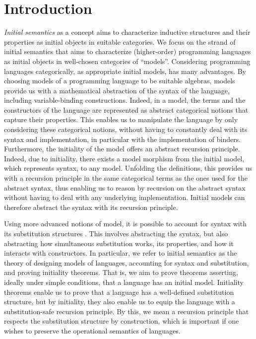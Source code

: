 \section{Introduction}

%
\emph{Initial semantics} as a concept aims to characterize inductive structures and their
properties as initial objects in suitable categories.
%
We focus on the strand of initial semantics that aims to characterize (higher-order)
programming languages as initial objects in well-chosen categories of ``models''.
%
Considering programming languages categorically, as appropriate initial models, has many advantages.
%
By choosing models of a programming language to be suitable algebras, models
provide us with a mathematical abstraction of the syntax of the language, including
variable-binding constructions.
%
Indeed, in a model, the terms and the constructors of the language are
represented as abstract categorical notions that capture their properties.
%
This enables us to manipulate the language by only considering these categorical
notions, without having to constantly deal with its syntax and implementation,
in particular with the implementation of binders.
%
Furthermore, the initiality of the model offers an abstract recursion principle.
Indeed, due to initiality, there exists a model morphism from the initial model,
which represents syntax, to any model.
%
Unfolding the definitions, this provides us with a recursion principle in the
same categorical terms as the ones used for the abstract syntax,
thus enabling us to reason by recursion on the abstract syntax without
having to deal with any underlying implementation.
%
Initial models can therefore abstract the syntax with its recursion
principle.

%
Using more advanced notions of model, it is possible to account for syntax with
its substitution structures \cite{FPT99,HirschowitzMaggesi07,Hss04}.
%
This involves abstracting the syntax, but also abstracting how simultaneous
substitution works, its properties, and how it interacts with constructors.
%
In particular, we refer to initial semantics as the theory of designing models
of languages, accounting for syntax and substitution, and proving initiality theorems.
That is, we aim to prove theorems asserting, ideally under simple conditions, that a language has an initial model.
%
Initiality theorems enable us to prove that a language has a well-defined
substitution structure, but by initiality, they also enable us to equip the
language with a substitution-safe recursion principle.
%
By this, we mean a recursion principle that respects the substitution structure by
construction, which is important if one wishes to preserve the operational semantics of
languages.



